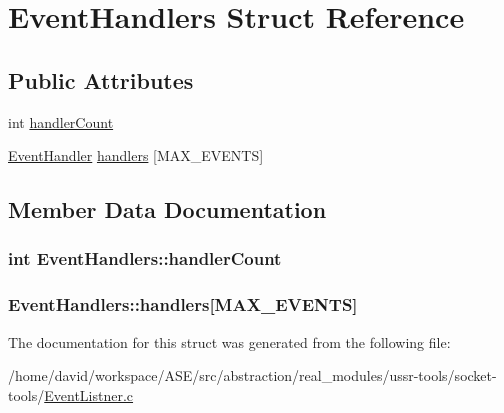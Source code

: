 \hypertarget{structEventHandlers}{
\section{EventHandlers Struct Reference}
\label{structEventHandlers}
}
\subsection*{Public Attributes}
\begin{CompactItemize}
\item 
int \hyperlink{structEventHandlers_44fbc1c148c4e0451eb04e05517bf900}{handlerCount}
\item 
\hyperlink{structEventHandler}{EventHandler} \hyperlink{structEventHandlers_fe3bc47b9269c19ff5e4867386c060bd}{handlers} \mbox{[}MAX\_\-EVENTS\mbox{]}
\end{CompactItemize}


\subsection{Member Data Documentation}
\hypertarget{structEventHandlers_44fbc1c148c4e0451eb04e05517bf900}{
\subsubsection{\setlength{\rightskip}{0pt plus 5cm}int {\bf EventHandlers::handlerCount}}}
\label{structEventHandlers_44fbc1c148c4e0451eb04e05517bf900}


\hypertarget{structEventHandlers_fe3bc47b9269c19ff5e4867386c060bd}{
\subsubsection{ {\bf EventHandlers::handlers}\mbox{[}MAX\_\-EVENTS\mbox{]}}}
\label{structEventHandlers_fe3bc47b9269c19ff5e4867386c060bd}




The documentation for this struct was generated from the following file:\begin{CompactItemize}
\item 
/home/david/workspace/ASE/src/abstraction/real\_\-modules/ussr-tools/socket-tools/\hyperlink{EventListner_8c}{EventListner.c}\end{CompactItemize}
